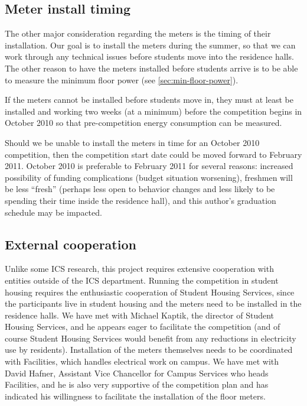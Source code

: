 \subsection{Meter install timing}

The other major consideration regarding the meters is the timing of their installation. Our goal is to install the meters during the summer, so that we can work through any technical issues before students move into the residence halls. The other reason to have the meters installed before students arrive is to be able to measure the minimum floor power (see \autoref{sec:min-floor-power}).

If the meters cannot be installed before students move in, they must at least be installed and working two weeks (at a minimum) before the competition begins in October 2010 so that pre-competition energy consumption can be measured.

Should we be unable to install the meters in time for an October 2010 competition, then the competition start date could be moved forward to February 2011. October 2010 is preferable to February 2011 for several reasons: increased possibility of funding complications (budget situation worsening), freshmen will be less ``fresh'' (perhaps less open to behavior changes and less likely to be spending their time inside the residence hall), and this author's graduation schedule may be impacted.

\subsection{External cooperation}
\label{sec:external-cooperation}

Unlike some ICS research, this project requires extensive cooperation with entities outside of the ICS department. Running the competition in student housing requires the enthusiastic cooperation of Student Housing Services, since the participants live in student housing and the meters need to be installed in the residence halls. We have met with Michael Kaptik, the director of Student Housing Services, and he appears eager to facilitate the competition (and of course Student Housing Services would benefit from any reductions in electricity use by residents). Installation of the meters themselves needs to be coordinated with Facilities, which handles electrical work on campus. We have met with David Hafner, Assistant Vice Chancellor for Campus Services who heads Facilities, and he is also very supportive of the competition plan and has indicated his willingness to facilitate the installation of the floor meters.

